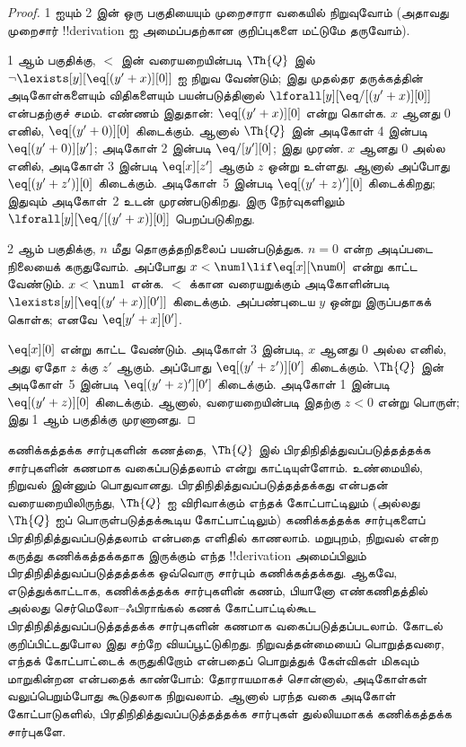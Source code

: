 \documentclass[11pt,a4paper,openany]{memoir}
\begin{document}
\begin{proof}
1 ஐயும் 2 இன் ஒரு பகுதியையும் முறைசாரா வகையில் நிறுவுவோம்
(அதாவது முறைசார் !!{derivation} ஐ அமைப்பதற்கான குறிப்புகளை மட்டுமே
தருவோம்).

1 ஆம் பகுதிக்கு, $<$ இன் வரையறையின்படி
$\Th{Q}$ இல்
$\lnot \lexists[y][\eq[(y'+x)][0]]$
ஐ நிறுவ வேண்டும்; இது முதல்தர தருக்கத்தின் அடிகோள்களையும் விதிகளையும்
பயன்படுத்தினால்
$\lforall[y][\eq/[(y' +
    x)][0]]$
என்பதற்குச் சமம். எண்ணம் இதுதான்: $\eq[(y'+x)][0]$
என்று கொள்க. $x$ ஆனது 0 எனில், $\eq[(y' + 0)][0]$
கிடைக்கும். ஆனால் $\Th{Q}$ இன் அடிகோள் 4 இன்படி
$\eq[(y' + 0)][y']$; அடிகோள் 2 இன்படி
$\eq/[y'][0]$; இது முரண்.
$x$ ஆனது $0$ அல்ல எனில், அடிகோள் 3 இன்படி
$\eq[x][z']$ ஆகும் $z$ ஒன்று உள்ளது. ஆனால் அப்போது
$\eq[(y' + z')][0]$ கிடைக்கும். அடிகோள்~5 இன்படி
$\eq[(y' + z)'][0]$ கிடைக்கிறது; இதுவும் அடிகோள்~2 உடன்
முரண்படுகிறது. இரு நேர்வுகளிலும்
$\lforall[y][\eq/[(y' +x)][0]]$ பெறப்படுகிறது.

2 ஆம் பகுதிக்கு, $n$ மீது தொகுத்தறிதலைப் பயன்படுத்துக.
$n =0$ என்ற அடிப்படை நிலையைக் கருதுவோம். அப்போது
$x < \num 1 \lif \eq[x][\num
  0]$ என்று காட்ட வேண்டும். $x < \num 1$ என்க.
$<$ க்கான வரையறுக்கும் அடிகோளின்படி
$\lexists[y][\eq[(y'+x)][0']]$ கிடைக்கும்.
அப்பண்புடைய $y$ ஒன்று இருப்பதாகக் கொள்க; எனவே
$\eq[y'+x][0']$.

$\eq[x][0]$ என்று காட்ட வேண்டும். அடிகோள் 3 இன்படி,
$x$ ஆனது 0 அல்ல எனில், அது ஏதோ $z$ க்கு $z'$ ஆகும்.
அப்போது $\eq[(y' + z')][0']$ கிடைக்கும்.
$\Th{Q}$ இன் அடிகோள்~5 இன்படி
$\eq[(y'+z)'][0']$ கிடைக்கும். அடிகோள் 1 இன்படி
$\eq[(y' +
    z)][0]$ கிடைக்கும். ஆனால், வரையறையின்படி இதற்கு
$z < 0$ என்று பொருள்; இது 1 ஆம் பகுதிக்கு முரணானது.
\end{proof}

\begin{explain}
கணிக்கத்தக்க சார்புகளின் கணத்தை, $\Th{Q}$ இல்
பிரதிநிதித்துவப்படுத்தத்தக்க சார்புகளின் கணமாக வகைப்படுத்தலாம் என்று
காட்டியுள்ளோம். உண்மையில், நிறுவல் இன்னும் பொதுவானது.
பிரதிநிதித்துவப்படுத்தத்தக்கது என்பதன் வரையறையிலிருந்து,
$\Th{Q}$ ஐ விரிவாக்கும் எந்தக் கோட்பாட்டிலும்
(அல்லது $\Th{Q}$ ஐப் பொருள்படுத்தக்கூடிய கோட்பாட்டிலும்)
கணிக்கத்தக்க சார்புகளைப் பிரதிநிதித்துவப்படுத்தலாம் என்பதை
எளிதில் காணலாம். மறுபுறம், நிறுவல் என்ற கருத்து கணிக்கத்தக்கதாக
இருக்கும் எந்த !!{derivation} அமைப்பிலும் பிரதிநிதித்துவப்படுத்தத்தக்க
ஒவ்வொரு சார்பும் கணிக்கத்தக்கது. ஆகவே, எடுத்துக்காட்டாக,
கணிக்கத்தக்க சார்புகளின் கணம், பியானோ எண்கணிதத்தில் அல்லது
செர்மெலோ--ஃபிராங்கல் கணக் கோட்பாட்டில்கூட
பிரதிநிதித்துவப்படுத்தத்தக்க சார்புகளின் கணமாக வகைப்படுத்தப்படலாம்.
கோடல் குறிப்பிட்டதுபோல இது சற்றே வியப்பூட்டுகிறது.
நிறுவத்தன்மையைப் பொறுத்தவரை, எந்தக் கோட்பாட்டைக் கருதுகிறோம்
என்பதைப் பொறுத்துக் கேள்விகள் மிகவும் மாறுகின்றன என்பதைக் காண்போம்:
தோராயமாகச் சொன்னால், அடிகோள்கள் வலுப்பெறும்போது கூடுதலாக நிறுவலாம்.
ஆனால் பரந்த வகை அடிகோள் கோட்பாடுகளில், பிரதிநிதித்துவப்படுத்தத்தக்க
சார்புகள் துல்லியமாகக் கணிக்கத்தக்க சார்புகளே.
\end{explain}
\end{document}
